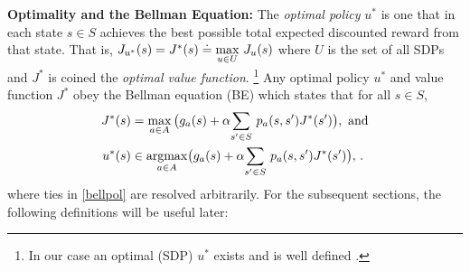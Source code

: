 \documentclass[twocolumn]{IEEEtran}
\begin{document}
\textbf{Optimality and the Bellman Equation:} The \emph{optimal policy} $u^*$ is one that in each state $s\in S$ achieves the best possible total expected discounted reward from that state. That is, $J_{u^*}(s) = J^*(s) \doteq \underset{u\in U}{\max}~ J_u(s)$
where $U$ is the set of all SDPs and $J^*$ is coined the \emph{optimal value function}.
\footnote{In our case an optimal (SDP) $u^*$ exists and is well defined \cite{BertB}.}
Any optimal policy $u^*$ and value function $J^*$ obey the Bellman equation (BE) which states that for all $ s \in S$,
\begin{subequations}\label{bell}
\begin{align}
\label{bellval}J^*(s)&=\max_{ a\in A}\big(g_a(s)+\alpha \us{\sum}{s'\in S}p_a(s,s')J^*(s')\big),~\text{and}\\
\label{bellpol}u^*(s)&\in \underset{a\in A}{\argmax}\big(g_a(s)+\alpha \us{\sum}{s'\in S}p_a(s,s')J^*(s')\big),\,.
\end{align}
\end{subequations}
where ties in \eqref{bellpol} are resolved arbitrarily.
For the subsequent sections, the following definitions will be useful later:
\end{document}
